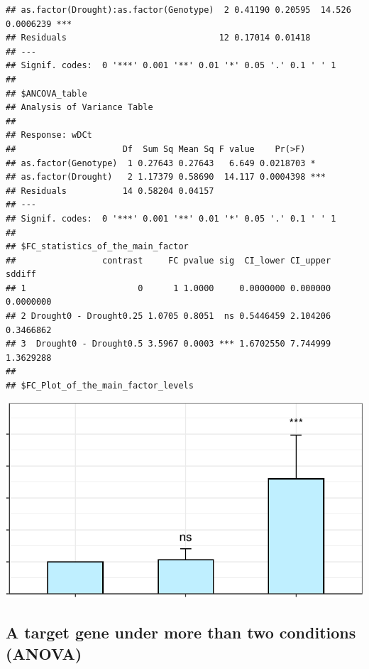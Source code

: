 \documentclass[
]{article}
\begin{document}
\begin{verbatim}
## as.factor(Drought):as.factor(Genotype)  2 0.41190 0.20595  14.526 0.0006239 ***
## Residuals                              12 0.17014 0.01418                      
## ---
## Signif. codes:  0 '***' 0.001 '**' 0.01 '*' 0.05 '.' 0.1 ' ' 1
## 
## $ANCOVA_table
## Analysis of Variance Table
## 
## Response: wDCt
##                     Df  Sum Sq Mean Sq F value    Pr(>F)    
## as.factor(Genotype)  1 0.27643 0.27643   6.649 0.0218703 *  
## as.factor(Drought)   2 1.17379 0.58690  14.117 0.0004398 ***
## Residuals           14 0.58204 0.04157                      
## ---
## Signif. codes:  0 '***' 0.001 '**' 0.01 '*' 0.05 '.' 0.1 ' ' 1
## 
## $FC_statistics_of_the_main_factor
##                 contrast     FC pvalue sig  CI_lower CI_upper    sddiff
## 1                      0      1 1.0000     0.0000000 0.000000 0.0000000
## 2 Drought0 - Drought0.25 1.0705 0.8051  ns 0.5446459 2.104206 0.3466862
## 3  Drought0 - Drought0.5 3.5967 0.0003 *** 1.6702550 7.744999 1.3629288
## 
## $FC_Plot_of_the_main_factor_levels
\end{verbatim}

\begin{center}\includegraphics{vignette_files/figure-latex/unnamed-chunk-8-1} \end{center}

\hypertarget{a-target-gene-under-more-than-two-conditions-anova}{%
\subsection{A target gene under more than two conditions
(ANOVA)}\label{a-target-gene-under-more-than-two-conditions-anova}}
\end{document}
